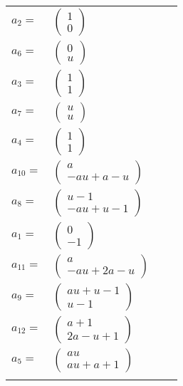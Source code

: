 \documentclass[1p]{elsarticle_modified}
\theoremstyle{definition}
\begin{document}
\begin{tabular}{m{7pt} m{180pt} m{7pt} m{180pt} }
\flushright $a_{2}=$&$\begin{pmatrix}1\\0\end{pmatrix}$ \\
\flushright $a_{6}=$&$\begin{pmatrix}0\\u\end{pmatrix}$ \\
\flushright $a_{3}=$&$\begin{pmatrix}1\\1\end{pmatrix}$ \\
\flushright $a_{7}=$&$\begin{pmatrix}u\\u\end{pmatrix}$ \\
\flushright $a_{4}=$&$\begin{pmatrix}1\\1\end{pmatrix}$ \\
\flushright $a_{10}=$&$\begin{pmatrix}a\\- a u+a- u\end{pmatrix}$ \\
\flushright $a_{8}=$&$\begin{pmatrix}u-1\\- a u+u-1\end{pmatrix}$ \\
\flushright $a_{1}=$&$\begin{pmatrix}0\\-1\end{pmatrix}$ \\
\flushright $a_{11}=$&$\begin{pmatrix}a\\- a u+2 a- u\end{pmatrix}$ \\
\flushright $a_{9}=$&$\begin{pmatrix}a u+u-1\\u-1\end{pmatrix}$ \\
\flushright $a_{12}=$&$\begin{pmatrix}a+1\\2 a- u+1\end{pmatrix}$ \\
\flushright $a_{5}=$&$\begin{pmatrix}a u\\a u+a+1\end{pmatrix}$\\&\end{tabular}
\end{document}

